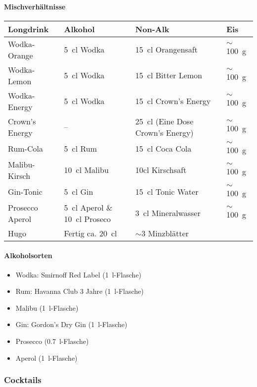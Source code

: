 \paragraph{Mischverhältnisse}
\begin{center}
  \begin{tabular}{llll}
    Longdrink & Alkohol & Non-Alk & Eis \\ \hline\hline
    Wodka-Orange &  \SI{5}{\centi\litre} Wodka & \SI{15}{\centi\litre} Orangensaft & $\sim$\SI{100}{\gram} \\ \hline
    Wodka-Lemon & \SI{5}{\centi\litre} Wodka & \SI{15}{\centi\litre} Bitter Lemon & $\sim$\SI{100}{\gram} \\ \hline
    Wodka-Energy & \SI{5}{\centi\litre} Wodka & \SI{15}{\centi\litre} Crown's Energy & $\sim$\SI{100}{\gram} \\ \hline
    Crown's Energy & -- & \SI{25}{\centi\litre} (Eine Dose Crown's Energy) & $\sim$\SI{100}{\gram} \\ \hline
    Rum-Cola & \SI{5}{\centi\litre} Rum & \SI{15}{\centi\litre} Coca Cola & $\sim$\SI{100}{\gram} \\ \hline
    Malibu-Kirsch & \SI{10}{\centi\litre} Malibu & 10cl Kirschsaft & $\sim$\SI{100}{\gram} \\ \hline
    Gin-Tonic & \SI{5}{\centi\litre} Gin & \SI{15}{\centi\litre} Tonic Water & $\sim$\SI{100}{\gram} \\ \hline
    Prosecco Aperol & \SI{5}{\centi\litre} Aperol \& \SI{10}{\centi\litre} Proseco & \SI{3}{\centi\litre} Mineralwasser & $\sim$\SI{100}{\gram} \\ \hline
    Hugo & Fertig ca. \SI{20}{\centi\litre} & $\sim$3 Minzblätter
  \end{tabular}
\end{center}

\paragraph{Alkoholsorten}
\begin{itemize}
  \item Wodka: Smirnoff Red Label (\SI{1}{\litre}-Flasche)
  \item Rum: Havanna Club 3 Jahre (\SI{1}{\litre}-Flasche)
  \item Malibu (\SI{1}{\litre}-Flasche)
  \item Gin: Gordon's Dry Gin (\SI{1}{\litre}-Flasche)
  \item Prosecco (\SI{0.7}{\litre}-Flasche) %
  \item Aperol (\SI{1}{\litre}-Flasche)
\end{itemize}

\subsubsection{Cocktails}
